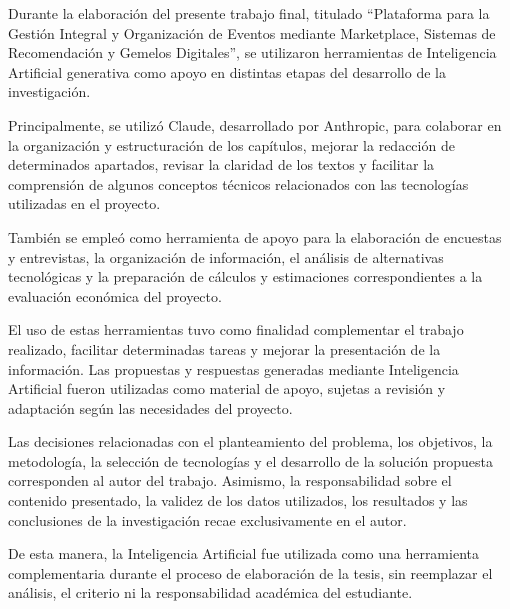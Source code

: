 
Durante la elaboración del presente trabajo final, titulado ``Plataforma para la Gestión Integral y Organización de Eventos mediante
Marketplace, Sistemas de Recomendación y Gemelos Digitales'', se
utilizaron herramientas de Inteligencia Artificial generativa como apoyo
en distintas etapas del desarrollo de la investigación.

Principalmente, se utilizó Claude, desarrollado por Anthropic, para
colaborar en la organización y estructuración de los capítulos, mejorar
la redacción de determinados apartados, revisar la claridad de los textos
y facilitar la comprensión de algunos conceptos técnicos relacionados con
las tecnologías utilizadas en el proyecto.

También se empleó como herramienta de apoyo para la elaboración de
encuestas y entrevistas, la organización de información, el análisis de
alternativas tecnológicas y la preparación de cálculos y estimaciones
correspondientes a la evaluación económica del proyecto.

El uso de estas herramientas tuvo como finalidad complementar el trabajo
realizado, facilitar determinadas tareas y mejorar la presentación de la
información. Las propuestas y respuestas generadas mediante Inteligencia
Artificial fueron utilizadas como material de apoyo, sujetas a revisión y
adaptación según las necesidades del proyecto.

Las decisiones relacionadas con el planteamiento del problema, los
objetivos, la metodología, la selección de tecnologías y el desarrollo de
la solución propuesta corresponden al autor del trabajo. Asimismo, la
responsabilidad sobre el contenido presentado, la validez de los datos
utilizados, los resultados y las conclusiones de la investigación recae
exclusivamente en el autor.

De esta manera, la Inteligencia Artificial fue utilizada como una
herramienta complementaria durante el proceso de elaboración de la tesis,
sin reemplazar el análisis, el criterio ni la responsabilidad académica
del estudiante.
